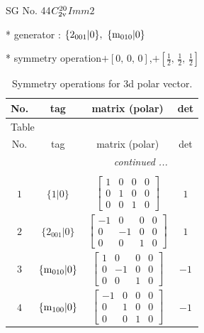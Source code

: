 \documentclass[fleqn,8pt]{jsarticle}
\begin{document}
\setcounter{MaxMatrixCols}{32}

\renewcommand{\tablename}{Table~}
\renewcommand{\figurename}{Figure~}
\begin{center}
\LARGE
SG No. 44\quad$C_{\rm 2v}^{20}$\quad$Imm2$\quad[ orthorhombic ]
\end{center}

* generator : $\{2{}_{001}|0\},\,\,\{{\rm m}_{010}|0\}$

* symmetry operation\quad$+\left[ 0,\, 0,\, 0 \right]$,\quad $+\left[ \frac{1}{2},\, \frac{1}{2},\, \frac{1}{2} \right]$
\renewcommand{\arraystretch}{1.3}
\begin{longtable}{cccc}
\caption{Symmetry operations for 3d polar vector.}
 \\
 \hline \hline
No. & tag & matrix (polar) & det \\ \hline \endfirsthead

\multicolumn{3}{l}{\tablename\ \thetable{}} \\
 \hline \hline
No. & tag & matrix (polar) & det \\ \hline \endhead

 \hline \hline
\multicolumn{3}{r}{\footnotesize\it continued ...} \\ \endfoot

 \hline \hline
\multicolumn{3}{r}{} \\ \endlastfoot

$ 1 $ & $ \{1|0\} $ & $ \begin{bmatrix} 1 & 0 & 0 & 0 \\ 0 & 1 & 0 & 0 \\ 0 & 0 & 1 & 0 \end{bmatrix} $ & $ 1 $ \\ \hline
$ 2 $ & $ \{2{}_{001}|0\} $ & $ \begin{bmatrix} -1 & 0 & 0 & 0 \\ 0 & -1 & 0 & 0 \\ 0 & 0 & 1 & 0 \end{bmatrix} $ & $ 1 $ \\ \hline
$ 3 $ & $ \{{\rm m}_{010}|0\} $ & $ \begin{bmatrix} 1 & 0 & 0 & 0 \\ 0 & -1 & 0 & 0 \\ 0 & 0 & 1 & 0 \end{bmatrix} $ & $ -1 $ \\ \hline
$ 4 $ & $ \{{\rm m}_{100}|0\} $ & $ \begin{bmatrix} -1 & 0 & 0 & 0 \\ 0 & 1 & 0 & 0 \\ 0 & 0 & 1 & 0 \end{bmatrix} $ & $ -1 $ \\
\end{longtable}
\end{document}
